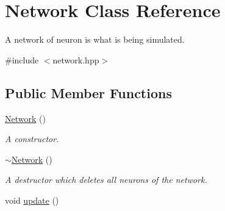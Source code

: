 \hypertarget{classNetwork}{\section{Network Class Reference}
\label{classNetwork}
}


A network of neuron is what is being simulated.  




{\ttfamily \#include $<$network.\-hpp$>$}

\subsection*{Public Member Functions}
\begin{DoxyCompactItemize}
\item 
\hyperlink{classNetwork_a3cc2fb4f8fa4d507077e8da85ce5a1c8}{Network} ()
\begin{DoxyCompactList}\small\item\em A constructor. \end{DoxyCompactList}\item 
\hypertarget{classNetwork_a7a4e19cdb4bf0c7ecf82baa643831492}{\hyperlink{classNetwork_a7a4e19cdb4bf0c7ecf82baa643831492}{$\sim$\-Network} ()}\label{classNetwork_a7a4e19cdb4bf0c7ecf82baa643831492}

\begin{DoxyCompactList}\small\item\em A destructor which deletes all neurons of the network. \end{DoxyCompactList}\item 
\hypertarget{classNetwork_ab07bb6f6d9020b9eb230551083ea929f}{void \hyperlink{classNetwork_ab07bb6f6d9020b9eb230551083ea929f}{update} ()}\label{classNetwork_ab07bb6f6d9020b9eb230551083ea929f}


\end{DoxyCompactItemize}
